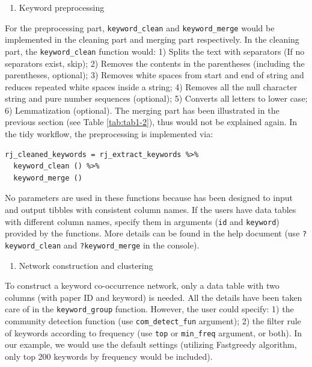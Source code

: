 \begin{enumerate}
\def\labelenumi{(\arabic{enumi})}
\setcounter{enumi}{1}
\tightlist
\item
  Keyword preprocessing
\end{enumerate}

For the preprocessing part, \texttt{keyword\_clean} and \texttt{keyword\_merge} would be implemented in the cleaning part and merging part respectively. In the cleaning part, the \texttt{keyword\_clean} function would: 1) Splits the text with separators (If no separators exist, skip); 2) Removes the contents in the parentheses (including the parentheses, optional); 3) Removes white spaces from start and end of string and reduces repeated white spaces inside a string; 4) Removes all the null character string and pure number sequences (optional); 5) Converts all letters to lower case; 6) Lemmatization (optional). The merging part has been illustrated in the previous section (see Table \ref{tab:tab1-2}), thus would not be explained again. In the tidy workflow, the preprocessing is implemented via:

\begin{verbatim}
rj_cleaned_keywords = rj_extract_keywords %>% 
  keyword_clean () %>% 
  keyword_merge ()
\end{verbatim}

No parameters are used in these functions because  has been designed to input and output tibbles with consistent column names. If the users have data tables with different column names, specify them in arguments (\texttt{id} and \texttt{keyword}) provided by the functions. More details can be found in the help document (use \texttt{?keyword\_clean} and \texttt{?keyword\_merge} in the console).

\begin{enumerate}
\def\labelenumi{(\arabic{enumi})}
\setcounter{enumi}{2}
\tightlist
\item
  Network construction and clustering
\end{enumerate}

To construct a keyword co-occurrence network, only a data table with two columns (with paper ID and keyword) is needed. All the details have been taken care of in the \texttt{keyword\_group} function. However, the user could specify: 1) the community detection function (use \texttt{com\_detect\_fun} argument); 2) the filter rule of keywords according to frequency (use \texttt{top} or \texttt{min\_freq} argument, or both). In our example, we would use the default settings (utilizing Fastgreedy algorithm, only top 200 keywords by frequency would be included).

